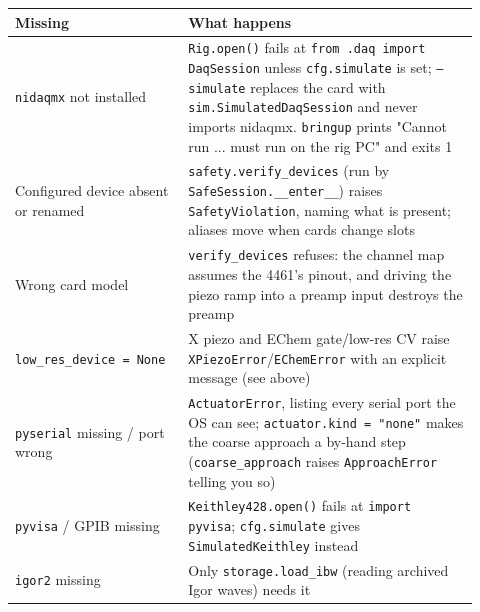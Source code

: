 \small\setlength{\LTleft}{0pt}\setlength{\LTright}{\fill}
\begin{longtable}{@{}>{\raggedright\arraybackslash}p{0.34\linewidth}>{\raggedright\arraybackslash}p{0.58\linewidth}@{}}
\toprule
\textbf{Missing} & \textbf{What happens} \\
\midrule\endhead
\texttt{nidaqmx} not installed & \texttt{Rig.\discretionary{}{}{}open()} fails at \texttt{from .\discretionary{}{}{}daq import Daq\discretionary{}{}{}Session} unless \texttt{cfg.\discretionary{}{}{}simulate} is set; \texttt{--simulate} replaces the card with \texttt{sim.\discretionary{}{}{}Simulated\discretionary{}{}{}Daq\discretionary{}{}{}Session} and never imports nidaqmx. \texttt{bringup} prints "Cannot run ... must run on the rig PC" and exits 1 \\
Configured device absent or renamed & \texttt{safety.\discretionary{}{}{}verify\_\discretionary{}{}{}devices} (run by \texttt{Safe\discretionary{}{}{}Session.\discretionary{}{}{}\_\discretionary{}{}{}\_\discretionary{}{}{}enter\_\discretionary{}{}{}\_\discretionary{}{}{}}) raises \texttt{Safety\discretionary{}{}{}Violation}, naming what is present; aliases move when cards change slots \\
Wrong card model & \texttt{verify\_\discretionary{}{}{}devices} refuses: the channel map assumes the 4461's pinout, and driving the piezo ramp into a preamp input destroys the preamp \\
\texttt{low\_\discretionary{}{}{}res\_\discretionary{}{}{}device = None} & X piezo and EChem gate/low-res CV raise \texttt{XPiezo\discretionary{}{}{}Error}/\texttt{EChem\discretionary{}{}{}Error} with an explicit message (see above) \\
\texttt{pyserial} missing / port wrong & \texttt{Actuator\discretionary{}{}{}Error}, listing every serial port the OS can see; \texttt{actuator.\discretionary{}{}{}kind = "none"} makes the coarse approach a by-hand step (\texttt{coarse\_\discretionary{}{}{}approach} raises \texttt{Approach\discretionary{}{}{}Error} telling you so) \\
\texttt{pyvisa} / GPIB missing & \texttt{Keithley428.\discretionary{}{}{}open()} fails at \texttt{import pyvisa}; \texttt{cfg.\discretionary{}{}{}simulate} gives \texttt{Simulated\discretionary{}{}{}Keithley} instead \\
\texttt{igor2} missing & Only \texttt{storage.\discretionary{}{}{}load\_\discretionary{}{}{}ibw} (reading archived Igor waves) needs it \\
\bottomrule
\end{longtable}
\normalsize

